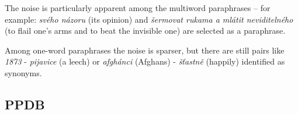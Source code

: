 The noise is particularly apparent among the multiword paraphrases -- for 
example: \textit{svého názoru}  (its opinion) and \textit{šermovat rukama a 
mlátit neviditelného} (to flail one's arms and to beat the invisible one) are 
selected as a paraphrase. 

Among one-word paraphrases the noise is sparser, but there are still pairs like 
\textit{1873} - \textit{pijavice} (a leech) or \textit{afgh\'{a}nci} (Afghans) - 
\textit{š\v{t}astně} (happily) identified as synonyms. 


\subsection{PPDB} 